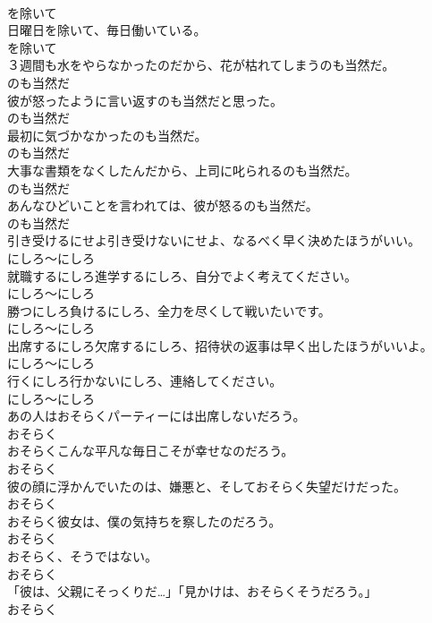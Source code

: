 \documentclass[8pt]{extreport}
\begin{document}
\begin{CJK}{UTF8}{min}
\\	を除いて	
\\	日曜日を除いて、毎日働いている。	
\\	を除いて	
\\	３週間も水をやらなかったのだから、花が枯れてしまうのも当然だ。	
\\	のも当然だ	
\\	彼が怒ったように言い返すのも当然だと思った。	
\\	のも当然だ	
\\	最初に気づかなかったのも当然だ。	
\\	のも当然だ	
\\	大事な書類をなくしたんだから、上司に叱られるのも当然だ。	
\\	のも当然だ	
\\	あんなひどいことを言われては、彼が怒るのも当然だ。	
\\	のも当然だ	
\\	引き受けるにせよ引き受けないにせよ、なるべく早く決めたほうがいい。	
\\	にしろ～にしろ	
\\	就職するにしろ進学するにしろ、自分でよく考えてください。	
\\	にしろ～にしろ	
\\	勝つにしろ負けるにしろ、全力を尽くして戦いたいです。	
\\	にしろ～にしろ	
\\	出席するにしろ欠席するにしろ、招待状の返事は早く出したほうがいいよ。	
\\	にしろ～にしろ	
\\	行くにしろ行かないにしろ、連絡してください。	
\\	にしろ～にしろ	
\\	あの人はおそらくパーティーには出席しないだろう。	
\\	おそらく	
\\	おそらくこんな平凡な毎日こそが幸せなのだろう。	
\\	おそらく	
\\	彼の顔に浮かんでいたのは、嫌悪と、そしておそらく失望だけだった。	
\\	おそらく	
\\	おそらく彼女は、僕の気持ちを察したのだろう。	
\\	おそらく	
\\	おそらく、そうではない。	
\\	おそらく	
\\	「彼は、父親にそっくりだ…」「見かけは、おそらくそうだろう。」	
\\	おそらく	

\end{CJK}
\end{document}
